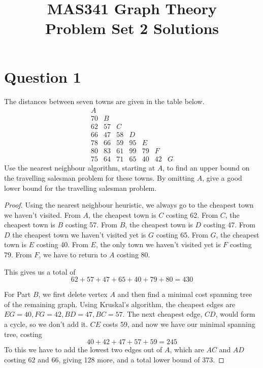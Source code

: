 \documentclass{amsart}
\title{MAS341 Graph Theory \\ Problem Set 2 Solutions}
\begin{document}
\maketitle

\section*{Question 1}
The distances between seven towns are given in the table below.
$$\begin{array}{ccccccc}
A  &   &   &   &   &   &  \\
70 & B &   &   &   &   &  \\
62 & 57& C &   &   &   &  \\
66 & 47& 58& D &   &   &  \\
78 & 66& 59&95 & E &   &  \\
80 &83 & 61&99 &79 & F &  \\
75 &64 &71 &65 &40 &42 &G
\end{array}$$
Use the nearest neighbour algorithm, starting at $A$, to find an upper bound on the travelling salesman problem for these towns.  By omitting $A$, give a good lower bound for the travelling salesman problem.
\begin{proof}
  Using the nearest neighbour heuristic, we always go to the cheapest town we haven't visited.
  From $A$, the cheapest town is $C$ costing 62.
  From $C$, the cheapest town is $B$ costing 57.
  From $B$, the cheapest town is $D$ costing 47.
  From $D$ the cheapest town we haven't visited yet is $G$ costing 65.
  From $G$, the cheapest town is $E$ costing 40.
  From $E$, the only town we haven't visited yet is $F$ costing 79.
  From $F$, we have to return to $A$ costing 80.

  This gives us a total of
  $$62+57+47+65+40+79+80=430$$

  For Part $B$, we first delete vertex $A$ and then find a minimal cost spanning tree of the remaining graph.  Using Kruskal's algorithm, the cheapest edges are $EG=40, FG=42, BD=47, BC=57$.
  The next cheapest edge, $CD$, would form a cycle, so we don't add it.
  $CE$ costs 59, and now we have our minimal spanning tree, costing
  $$40+42+47+57+59=245$$
  To this we have to add the lowest two edges out of $A$, which are $AC$ and $AD$ costing  $62$ and $66$, giving 128 more, and a total lower bound of $373$.
  

  \end{proof}
\end{document}
